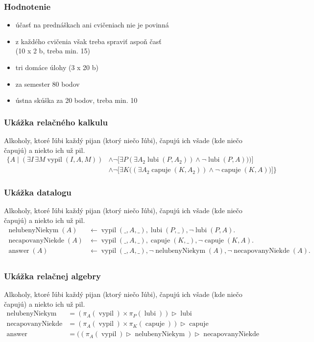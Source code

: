 \documentclass[12pt]{beamer}
\DeclareMathOperator{\antijoin}{\rhd}
\DeclareMathOperator{\lubi}{lubi}
\DeclareMathOperator{\capuje}{capuje}
\DeclareMathOperator{\vypil}{vypil}
\DeclareMathOperator{\answer}{answer}
\begin{document}
\begin{frame}
\frametitle{Hodnotenie}
\begin{itemize}
\item účasť na prednáškach ani cvičeniach nie je povinná
\item z každého cvičenia však treba spraviť aspoň časť\\(10 x 2 b, treba min. 15)
\item tri domáce úlohy (3 x 20 b)
\item za semester 80 bodov
\pause
\item ústna skúška za 20 bodov, treba min. 10
\end{itemize}
\end{frame}

\begin{frame}
\frametitle{Ukážka relačného kalkulu}
Alkoholy, ktoré ľúbi každý pijan (ktorý niečo ľúbi), čapujú ich všade (kde niečo čapujú) a niekto ich už pil.
{\tiny
\begin{align*}
\Big\{A\mid (\exists I\,\exists M\vypil(I, A, M))&\land \lnot \Big[\exists P (\exists A_2\lubi(P, A_2))\land\lnot\lubi(P, A))\Big)\Big]\\
&\land \lnot\Big[\exists K \Big((\exists A_2 \capuje(K, A_2))\land \lnot\capuje(K, A)\Big)\Big]\Big\}
\end{align*}
}
\end{frame}

\begin{frame}
\frametitle{Ukážka datalogu}
Alkoholy, ktoré ľúbi každý pijan (ktorý niečo ľúbi), čapujú ich všade (kde niečo čapujú) a niekto ich už pil.
{\tiny
\begin{align*}
\operatorname{nelubenyNiekym}(A) &\leftarrow \vypil(\_, A, \_), \lubi(P, \_), \lnot\lubi(P, A).\\
\operatorname{necapovanyNiekde}(A) &\leftarrow \vypil(\_, A, \_), \capuje(K, \_), \lnot\capuje(K, A).\\
\answer(A) &\leftarrow \vypil(\_, A, \_), \lnot\operatorname{nelubenyNiekym}(A), \lnot\operatorname{necapovanyNiekde}(A).\\
\end{align*}
}
\end{frame}

\begin{frame}
\frametitle{Ukážka relačnej algebry}
Alkoholy, ktoré ľúbi každý pijan (ktorý niečo ľúbi), čapujú ich všade (kde niečo čapujú) a niekto ich už pil.
{\tiny
\begin{align*}
\operatorname{nelubenyNiekym} & = (\pi_A(\vypil)\times \pi_P(\lubi))\antijoin \lubi\\
\operatorname{necapovanyNiekde} & = (\pi_A(\vypil)\times \pi_K(\capuje))\antijoin \capuje\\
\answer & = ((\pi_A(\vypil) \antijoin \operatorname{nelubenyNiekym})\antijoin \operatorname{necapovanyNiekde}\\
\end{align*}
}
\end{frame}
\end{document}
